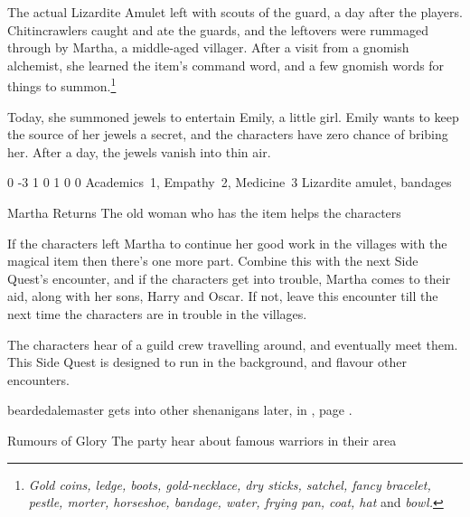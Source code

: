 \begin{multicols}{2}
The actual Lizardite Amulet left with scouts of the \gls{guard}, a day after the players.
Chitincrawlers caught and ate the guards, and the leftovers were rummaged through by Martha, a middle-aged villager.
After a visit from a gnomish alchemist, she learned the item's command word, and a few gnomish words for things to summon.\footnote
{\textit{Gold coins, ledge, boots, gold-necklace, dry sticks, satchel, fancy bracelet, pestle, morter, horseshoe, bandage, water, frying pan, coat, hat} and \textit{bowl.}}

Today, she summoned jewels to entertain Emily, a little girl.
Emily wants to keep the source of her jewels a secret, and the characters have zero chance of bribing her.
After a day, the jewels vanish into thin air.


  {0}%
  {-3}%
  {{1}%
  {0}%
  {1}}%
  {0}%
  {0}%
  {Academics~1, Empathy~2, Medicine~3}%
  {Lizardite amulet, bandages}%
  {}

{\squash Martha Returns}%
{The old woman who has the item helps the characters}%

If the characters left Martha to continue her good work in the villages with the magical item then there's one more part.
Combine this with the next Side Quest's encounter, and if the characters get into trouble, Martha comes to their aid, along with her sons, Harry and Oscar.
If not, leave this encounter till the next time the characters are in trouble in the villages.


\stopcontents[sq]

\startcontents[Forest]
\resumecontents[Villages]
\stopcontents[Forest]
\stopcontents[Villages]

\startcontents[sq]

\sqminitoc

\noindent
The characters hear of a guild crew travelling around, and eventually meet them.
This Side Quest is designed to run in the background, and flavour other encounters.

\Gls{beardedalemaster} gets into other shenanigans later, in , page \pageref{troubleAle}.

{\N \squash Rumours of Glory}%
{The party hear about famous warriors in their area}%


\end{multicols}
